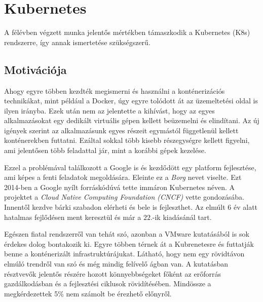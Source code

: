 \chapter{Kubernetes}
\label{sec:Kubernetes}
A félévben végzett munka jelentős mértékben támaszkodik a Kubernetes (K8s) rendszerre, így annak ismertetése szükségszerű. 

\section{Motivációja}
Ahogy egyre többen kezdték megismerni és használni a konténerizációs technikákat, mint például a Docker, úgy egyre tolódott át az üzemeltetési oldal is ilyen irányba. Ezek után nem  az jelentette a kihívást, hogy az egyes alkalmazásokat egy dedikált virtuális gépen kellett beüzemelni és elindítani. Az új igények szerint az alkalmazásunk egyes részeit egymástól függetlenül kellett konténerekben futtatni. Ezáltal sokkal több kisebb részegységre kellett figyelni, ami jelentősen több feladattal jár, mint a korábbi gépek kezelése. 

Ezzel a problémával találkozott a Google is és kezdődött egy platform fejlesztése, ami képes a fenti feladatok megoldására. Eleinte ez a \textit{Borg}\citep{Borg} nevet viselte. Ezt 2014-ben a Google nyílt forráskódúvá tette immáron Kubernetes néven. A projektet a \textit{Cloud Native Computing Foundation (CNCF)}\citep{cncf} vette gondozásába. Innentől kezdve bárki szabadon elérheti és bele is fejleszthet. Az elmúlt 6 év alatt hatalmas fejlődésen ment keresztül és már a $22$.-ik kiadásánál tart.

Egészen fiatal rendszerről van tehát szó, azonban a VMware kutatásából\citep{VMwareSurvey} is sok érdekes dolog bontakozik ki. Egyre többen térnek át a Kubrenetesre és futtatják benne a konténerizált infrastruktúrájukat. Látható, hogy nem egy rövidtávon elmúló trendről van szó és még mindig felívelő ágban van. A kutatásban résztvevők jelentős részére hozott könnyebbségeket főként az erőforrás gazdálkodásban és a fejlesztési ciklusok rövidítésében. Mindössze a megkérdezettek 5\% nem számolt be érezhető előnyről.  

